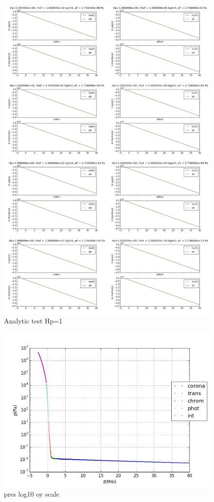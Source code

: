\documentclass[10pt]{book}
\begin{document}
\begin{figure}[H]
 \centering
 \includegraphics[scale=0.5]{allanalytic2.png}
 \caption{Analytic test Hp=1}
\end{figure}


\begin{figure}[H]
 \centering
 \includegraphics[scale=0.5]{fromFileLogScale1.png}
 \caption{pres log10 oy scale}
\end{figure}
\end{document}
